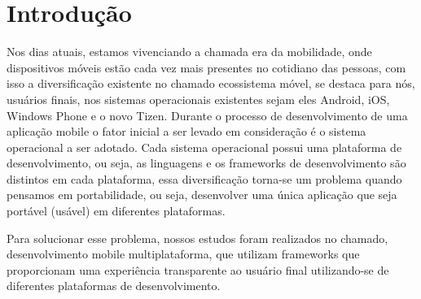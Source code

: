 \chapter{Introdução} %
\label{cha:introducao}
Nos dias atuais, estamos vivenciando a chamada era da mobilidade, onde dispositivos móveis estão cada vez mais
presentes no cotidiano das pessoas, com isso a diversificação existente no chamado ecossistema móvel,
se destaca para nós, usuários finais, nos sistemas operacionais existentes sejam eles Android, iOS, Windows
Phone e o novo Tizen. Durante o processo de desenvolvimento de uma aplicação mobile o fator inicial a ser
levado em consideração é o sistema operacional a ser adotado. Cada sistema operacional possui uma plataforma de
desenvolvimento, ou seja, as linguagens e os frameworks de desenvolvimento são distintos em cada plataforma,
essa diversificação torna-se um problema quando pensamos em portabilidade, ou seja, desenvolver uma única
aplicação que seja portável (usável) em diferentes plataformas.

Para solucionar esse problema, nossos estudos foram realizados no chamado, desenvolvimento mobile
multiplataforma, que utilizam frameworks que proporcionam uma experiência transparente ao usuário final
utilizando-se de diferentes plataformas de desenvolvimento.
